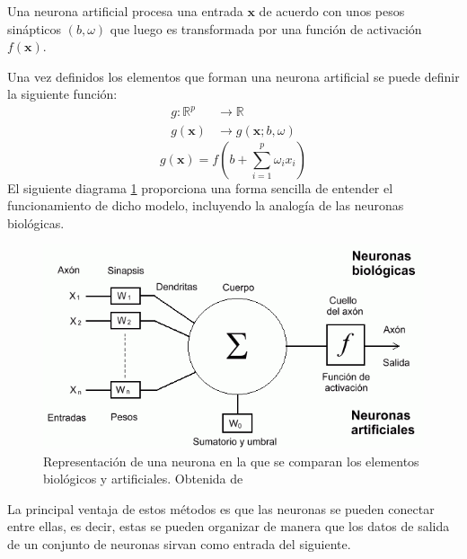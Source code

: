 \begin{defi}
Una neurona artificial procesa una entrada $\textbf{x}$ de acuerdo con unos pesos sinápticos $(b,\omega)$ que luego es transformada por una función de activación $f(\mathbf{x})$.

\noindent Una  vez definidos los elementos que forman una neurona artificial se puede definir la siguiente función:
\begin{equation}
\begin{split}
g:\mathbb{R}^p &\longrightarrow \mathbb{R}\\
g(\textbf{x})&\longrightarrow g(\textbf{x};b,\omega)
\end{split}
\end{equation}
\begin{equation}
g(\textbf{x})=f\left(b+\sum_{i=1}^p \omega_i x_i\right)
\end{equation}
El siguiente diagrama \ref{fig:neurona-biológica} proporciona una forma sencilla de entender el funcionamiento de dicho modelo, incluyendo la analogía de las neuronas biológicas. 
\end{defi}
\begin{figure}
\begin{center}
\includegraphics[scale=0.6]{Documentos Extra/Imagenes/neurona.png}
\caption{Representación de una neurona en la que se comparan los elementos biológicos y artificiales. Obtenida de \cite{Requena}}
\label{fig:neurona-biológica}
\end{center}
\end{figure}


\noindent La principal ventaja de estos métodos es que las neuronas se pueden conectar entre ellas, es decir, estas se pueden organizar de manera que los datos de salida de un conjunto de neuronas sirvan como  entrada del siguiente.

